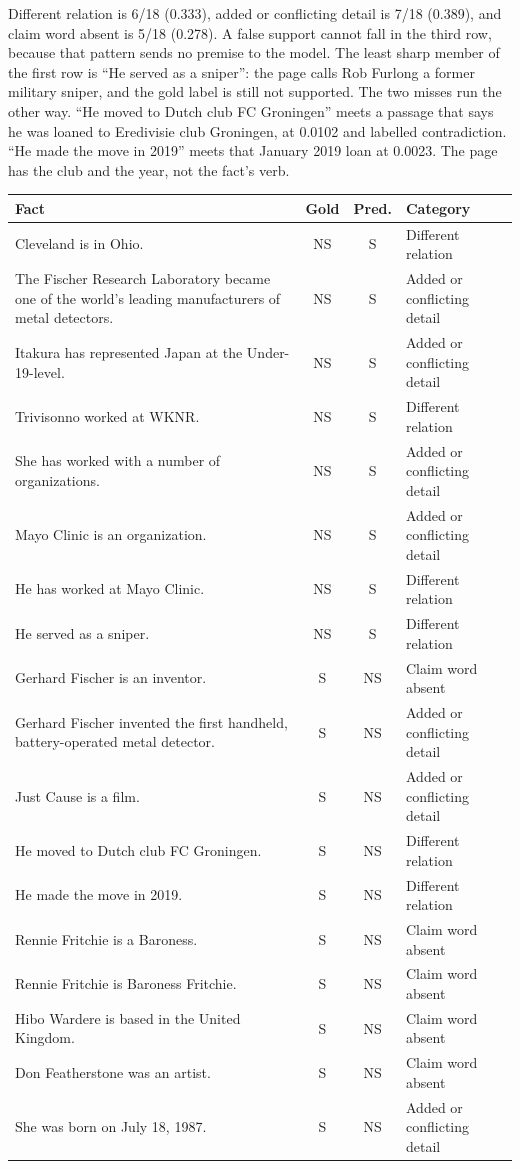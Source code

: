 Different relation is 6/18 (0.333), added or conflicting detail is 7/18 (0.389), and claim word absent is 5/18 (0.278). A false support cannot fall in the third row, because that pattern sends no premise to the model. The least sharp member of the first row is ``He served as a sniper'': the page calls Rob Furlong a former military sniper, and the gold label is still not supported. The two misses run the other way. ``He moved to Dutch club FC Groningen'' meets a passage that says he was loaned to Eredivisie club Groningen, at 0.0102 and labelled contradiction. ``He made the move in 2019'' meets that January 2019 loan at 0.0023. The page has the club and the year, not the fact's verb.

{\footnotesize
\begin{tabularx}{\textwidth}{@{}>{\raggedright\arraybackslash}Xcc>{\raggedright\arraybackslash}p{3.5cm}@{}}
\toprule
Fact & Gold & Pred. & Category \\
\midrule
Cleveland is in Ohio. & NS & S & Different relation \\
The Fischer Research Laboratory became one of the world's leading manufacturers of metal detectors. & NS & S & Added or conflicting detail \\
Itakura has represented Japan at the Under-19-level. & NS & S & Added or conflicting detail \\
Trivisonno worked at WKNR. & NS & S & Different relation \\
She has worked with a number of organizations. & NS & S & Added or conflicting detail \\
Mayo Clinic is an organization. & NS & S & Added or conflicting detail \\
He has worked at Mayo Clinic. & NS & S & Different relation \\
He served as a sniper. & NS & S & Different relation \\
Gerhard Fischer is an inventor. & S & NS & Claim word absent \\
Gerhard Fischer invented the first handheld, battery-operated metal detector. & S & NS & Added or conflicting detail \\
Just Cause is a film. & S & NS & Added or conflicting detail \\
He moved to Dutch club FC Groningen. & S & NS & Different relation \\
He made the move in 2019. & S & NS & Different relation \\
Rennie Fritchie is a Baroness. & S & NS & Claim word absent \\
Rennie Fritchie is Baroness Fritchie. & S & NS & Claim word absent \\
Hibo Wardere is based in the United Kingdom. & S & NS & Claim word absent \\
Don Featherstone was an artist. & S & NS & Claim word absent \\
She was born on July 18, 1987. & S & NS & Added or conflicting detail \\
\bottomrule
\end{tabularx}
}

